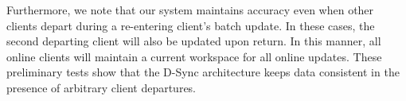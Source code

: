 Furthermore, we note that our system maintains accuracy
even when other clients depart during a re-entering client's batch update.
In these cases, the second departing client
will also be updated upon return.
In this manner, all online clients will maintain a
current workspace for all online updates.
These preliminary tests show that the D-Sync architecture keeps data consistent
in the presence of arbitrary client departures.


